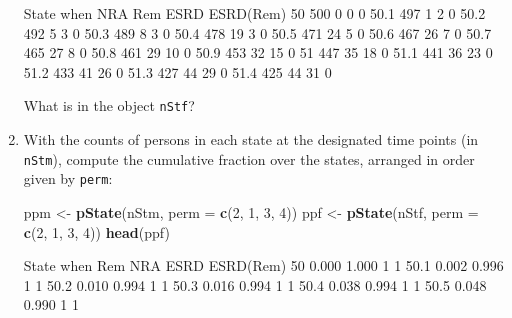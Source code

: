 \documentclass[
]{book}
\newenvironment{Shaded}{\begin{snugshade}}{\end{snugshade}}
\newcommand{\AttributeTok}[1]{\textcolor[rgb]{0.13,0.29,0.53}{#1}}
\newcommand{\DecValTok}[1]{\textcolor[rgb]{0.00,0.00,0.81}{#1}}
\newcommand{\FunctionTok}[1]{\textcolor[rgb]{0.13,0.29,0.53}{\textbf{#1}}}
\newcommand{\NormalTok}[1]{#1}
\newcommand{\OtherTok}[1]{\textcolor[rgb]{0.56,0.35,0.01}{#1}}
\begin{document}
\begin{enumerate}
\begin{Shaded}
\begin{Highlighting}[]
\NormalTok{      State}
\NormalTok{when   NRA Rem ESRD ESRD(Rem)}
\NormalTok{  50   500   0    0         0}
\NormalTok{  50.1 497   1    2         0}
\NormalTok{  50.2 492   5    3         0}
\NormalTok{  50.3 489   8    3         0}
\NormalTok{  50.4 478  19    3         0}
\NormalTok{  50.5 471  24    5         0}
\NormalTok{  50.6 467  26    7         0}
\NormalTok{  50.7 465  27    8         0}
\NormalTok{  50.8 461  29   10         0}
\NormalTok{  50.9 453  32   15         0}
\NormalTok{  51   447  35   18         0}
\NormalTok{  51.1 441  36   23         0}
\NormalTok{  51.2 433  41   26         0}
\NormalTok{  51.3 427  44   29         0}
\NormalTok{  51.4 425  44   31         0}
\end{Highlighting}
\end{Shaded}

  What is in the object \texttt{nStf}?
\item
  With the counts of persons in each state at the
  designated time points (in \texttt{nStm}), compute the cumulative
  fraction over the states, arranged in order given by \texttt{perm}:

\begin{Shaded}
\begin{Highlighting}[]
\NormalTok{ppm }\OtherTok{\textless{}{-}} \FunctionTok{pState}\NormalTok{(nStm, }\AttributeTok{perm =} \FunctionTok{c}\NormalTok{(}\DecValTok{2}\NormalTok{, }\DecValTok{1}\NormalTok{, }\DecValTok{3}\NormalTok{, }\DecValTok{4}\NormalTok{))}
\NormalTok{ppf }\OtherTok{\textless{}{-}} \FunctionTok{pState}\NormalTok{(nStf, }\AttributeTok{perm =} \FunctionTok{c}\NormalTok{(}\DecValTok{2}\NormalTok{, }\DecValTok{1}\NormalTok{, }\DecValTok{3}\NormalTok{, }\DecValTok{4}\NormalTok{))}
\FunctionTok{head}\NormalTok{(ppf)}
\end{Highlighting}
\end{Shaded}

\begin{Shaded}
\begin{Highlighting}[]
\NormalTok{      State}
\NormalTok{when     Rem   NRA ESRD ESRD(Rem)}
\NormalTok{  50   0.000 1.000    1         1}
\NormalTok{  50.1 0.002 0.996    1         1}
\NormalTok{  50.2 0.010 0.994    1         1}
\NormalTok{  50.3 0.016 0.994    1         1}
\NormalTok{  50.4 0.038 0.994    1         1}
\NormalTok{  50.5 0.048 0.990    1         1}
\end{Highlighting}
\end{Shaded}


\end{enumerate}
\end{document}
